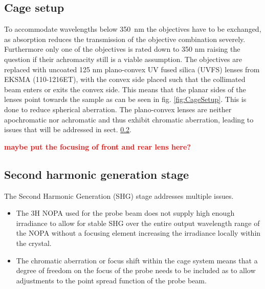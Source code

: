 \documentclass[twoside,openright]{scrreprt}
\begin{document}
\subsection{Cage setup}
To accommodate wavelengths below \qty{350}{\nano\meter} the objectives have to be exchanged, as absorption reduces the transmission of the objective combination severely. Furthermore only one of the objectives is rated down to 350 nm raising the question if their achromacity still is a viable assumption.\newline
The objectives are replaced with  uncoated 125 nm plano-convex UV fused silica (UVFS) lenses from EKSMA (110-1216ET), with the convex side placed such that the collimated beam enters or exits the convex side. This means that the planar sides of the lenses point towards the sample as can be seen in fig. \ref{fig:CageSetup}. This is done to reduce spherical aberration.
\newline
The plano-convex lenses are neither apochromatic nor achromatic and thus exhibit chromatic aberration, leading to issues that will be addressed in sect. \ref{sec:SHG-Stage-desc}. \newline

\textbf{\textcolor{red}{maybe put the focusing of front and rear lens here?}}
\subsection{Second harmonic generation stage}\label{sec:SHG-Stage-desc}
The Second Harmonic Generation (SHG) stage addresses multiple issues. 
\begin{itemize}
\item The 3H NOPA used for the probe beam does not supply high enough irradiance to allow for stable SHG over the entire output wavelength range of the NOPA without a focusing element increasing the irradiance locally within the crystal. 
\item The chromatic aberration or focus shift within the cage system means that a degree of freedom on the focus of the probe needs to be included as to allow adjustments to the point spread function of the probe beam.
\end{itemize}
\end{document}
